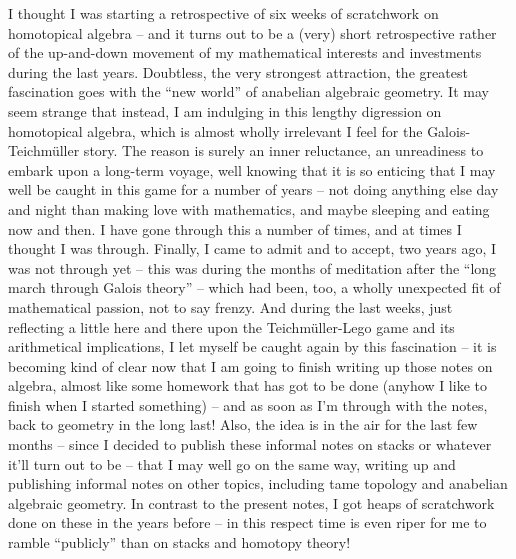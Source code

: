 I thought I was starting a retrospective of six weeks of
scratchwork on homotopical algebra -- and it turns out to be a (very)
short retrospective rather of the up-and-down movement of my
mathematical interests and investments during the last
years. Doubtless, the very strongest attraction, the greatest
fascination goes with the ``new world'' of anabelian algebraic
geometry. It may seem strange that instead, I am indulging in this
lengthy digression on homotopical algebra, which is almost wholly
irrelevant I feel for the Galois-Teichmüller story. The reason is
surely an inner reluctance, an unreadiness to embark upon a long-term
voyage, well knowing that it is so enticing that I may well be caught
in this game for a number of years -- not doing anything else day and
night than making love with mathematics, and maybe sleeping and eating
now and then. I have gone through this a number of times, and at times
I thought I was through. Finally, I came to admit and to accept, two
years ago, I was not through yet -- this was during the months of
meditation after the ``long march through Galois theory'' -- which had
been, too, a wholly unexpected fit of mathematical passion, not to say
frenzy. And during the last weeks, just reflecting a little here and
there upon the Teichmüller-Lego game and its arithmetical
implications, I let myself be caught again by this fascination -- it
is becoming kind of clear now that I am going to finish writing up
those notes on algebra, almost like some homework that has got to be
done (anyhow I like to finish when I started something) -- and as soon
as I'm through with the notes, back to geometry in the long last!
Also, the idea is in the air for the last few months -- since I
decided to publish these informal notes on stacks or whatever it'll
turn out to be -- that I may well go on the same way, writing up and
publishing informal notes on other topics, including tame topology and
anabelian algebraic geometry. In contrast to the present notes, I got
heaps of scratchwork done on these in the years before -- in this
respect time is even riper for me to ramble ``publicly'' than on
stacks and homotopy theory!

